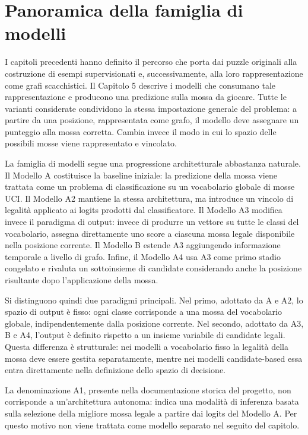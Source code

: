 \label{chap:models}

\section{Panoramica della famiglia di modelli}

I capitoli precedenti hanno definito il percorso che porta dai puzzle originali alla costruzione di esempi supervisionati e, successivamente, alla loro rappresentazione come grafi scacchistici. Il Capitolo 5 descrive i modelli che consumano tale rappresentazione e producono una predizione sulla mossa da giocare. Tutte le varianti considerate condividono la stessa impostazione generale del problema: a partire da una posizione, rappresentata come grafo, il modello deve assegnare un punteggio alla mossa corretta. Cambia invece il modo in cui lo spazio delle possibili mosse viene rappresentato e vincolato.

La famiglia di modelli segue una progressione architetturale abbastanza naturale. Il Modello A costituisce la baseline iniziale: la predizione della mossa viene trattata come un problema di classificazione su un vocabolario globale di mosse UCI. Il Modello A2 mantiene la stessa architettura, ma introduce un vincolo di legalit\`a applicato ai logits prodotti dal classificatore. Il Modello A3 modifica invece il paradigma di output: invece di produrre un vettore su tutte le classi del vocabolario, assegna direttamente uno score a ciascuna mossa legale disponibile nella posizione corrente. Il Modello B estende A3 aggiungendo informazione temporale a livello di grafo. Infine, il Modello A4 usa A3 come primo stadio congelato e rivaluta un sottoinsieme di candidate considerando anche la posizione risultante dopo l'applicazione della mossa.

Si distinguono quindi due paradigmi principali. Nel primo, adottato da A e A2, lo spazio di output \`e fisso: ogni classe corrisponde a una mossa del vocabolario globale, indipendentemente dalla posizione corrente. Nel secondo, adottato da A3, B e A4, l'output \`e definito rispetto a un insieme variabile di candidate legali. Questa differenza \`e strutturale: nei modelli a vocabolario fisso la legalit\`a della mossa deve essere gestita separatamente, mentre nei modelli candidate-based essa entra direttamente nella definizione dello spazio di decisione.

La denominazione A1, presente nella documentazione storica del progetto, non corrisponde a un'architettura autonoma: indica una modalit\`a di inferenza basata sulla selezione della migliore mossa legale a partire dai logits del Modello A. Per questo motivo non viene trattata come modello separato nel seguito del capitolo.

